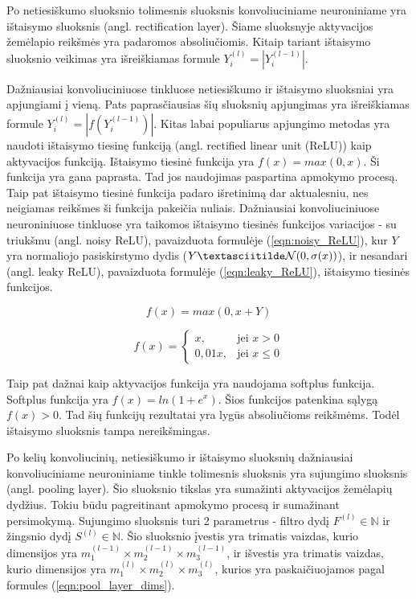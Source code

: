 Po netiesiškumo sluoksnio tolimesnis sluoksnis konvoliuciniame neuroniniame yra ištaisymo sluoksnis (angl. rectification layer). Šiame sluoksnyje aktyvacijos žemėlapio reikšmės yra padaromos absoliučiomis. Kitaip tariant ištaisymo sluoksnio veikimas yra išreiškiamas formule $Y_i^{(l)} = |Y_i^{(l - 1)}|$.

Dažniausiai konvoliuciniuose tinkluose netiesiškumo ir ištaisymo sluoksniai yra apjungiami į vieną. Pats paprasčiausias šių sluoksnių apjungimas yra išreiškiamas formule $Y_i^{(l)} = |f(Y_i^{(l - 1)})|$. Kitas labai populiarus apjungimo metodas yra naudoti ištaisymo tiesinę funkciją (angl. rectified linear unit (ReLU)) kaip aktyvacijos funkciją. Ištaisymo tiesinė funkcija yra $f(x) = max(0, x)$. Ši funkcija yra gana paprasta. Tad jos naudojimas paspartina apmokymo procesą. Taip pat ištaisymo tiesinė funkcija padaro išretinimą dar aktualesniu, nes neigiamas reikšmes ši funkcija pakeičia nuliais. Dažniausiai konvoliuciniuose neuroniniuose tinkluose yra taikomos ištaisymo tiesinės funkcijos variacijos - su triukšmu (angl. noisy ReLU), pavaizduota formulėje (\ref{eqn:noisy_ReLU}), kur $Y$ yra normaliojo pasiskirstymo dydis ($Y \textasciitilde \mathcal{N}(0, \sigma(x))$), ir nesandari (angl. leaky ReLU), pavaizduota formulėje (\ref{eqn:leaky_ReLU}),  ištaisymo tiesinės funkcijos.

\begin{equation}
\label{eqn:noisy_ReLU}
	f(x) = max(0, x + Y)
\end{equation}

\begin{equation}
\label{eqn:leaky_ReLU}
	f(x) = 
	\begin{cases}
	x, & \mbox{jei } x > 0 \\
	0,01x, & \mbox{jei } x \leq 0
	\end{cases}
\end{equation}

Taip pat dažnai kaip aktyvacijos funkcija yra naudojama softplus funkcija. Softplus funkcija yra $f(x) = ln(1 + e^x)$. Šios funkcijos patenkina sąlygą $f(x) > 0$. Tad šių funkcijų rezultatai yra lygūs absoliučioms reikšmėms. Todėl ištaisymo sluoksnis tampa nereikšmingas.

Po kelių konvoliucinių, netiesiškumo ir ištaisymo sluoksnių dažniausiai konvoliuciniame neuroniniame tinkle tolimesnis sluoksnis yra sujungimo sluoksnis (angl. pooling layer). Šio sluoksnio tikslas yra sumažinti aktyvacijos žemėlapių dydžius. Tokiu būdu pagreitinant apmokymo procesą ir sumažinant persimokymą. Sujungimo sluoksnis turi 2 parametrus - filtro dydį $F^{(l)} \in \mathbb{N}$ ir žingsnio dydį $S^{(l)} \in \mathbb{N}$. Šio sluoksnio įvestis yra trimatis vaizdas, kurio dimensijos yra $m_1^{(l-1)} \times m_2^{(l-1)} \times m_3^{(l-1)}$, ir išvestis yra trimatis vaizdas, kurio dimensijos yra $m_1^{(l)} \times m_2^{(l)} \times m_3^{(l)}$, kurios yra paskaičiuojamos pagal formules (\ref{eqn:pool_layer_dims}).

